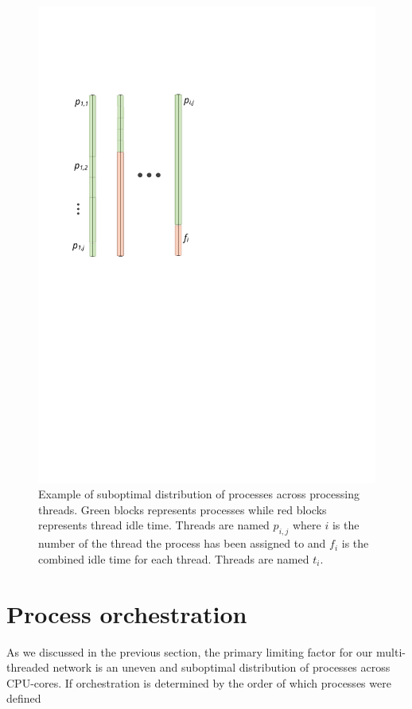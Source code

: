 \begin{figure}
\centering
\includegraphics{figures/parallel}
\caption[Proposed SME parallelization model]{Example of suboptimal
  distribution of processes across processing threads. Green blocks
  represents processes while red blocks represents thread idle
  time. Threads are named $p_{i,j}$ where $i$ is the number of the
  thread the process has been assigned to and $f_i$ is the combined
  idle time for each thread. Threads are named $t_i$.}

\label{fig:subopt-dist}

\end{figure}

\section{Process orchestration}
As we discussed in the previous section, the primary limiting factor
for our multi-threaded network is an uneven and suboptimal
distribution of processes across CPU-cores. If orchestration is
determined by the order of which processes were defined

